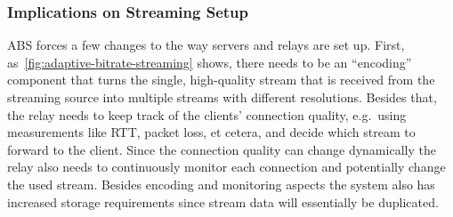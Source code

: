 \subsubsection{Implications on Streaming Setup}
ABS forces a few changes to the way servers and relays are set up.
First, as~\autoref{fig:adaptive-bitrate-streaming} shows, there needs to 
be an ``encoding'' component that turns the single, high-quality stream that is 
received from the streaming source into multiple streams with different resolutions.
Besides that, the relay needs to keep track of the clients' connection quality, e.g.~using 
measurements like RTT, packet loss, et cetera, and decide which stream to forward to the client.
Since the connection quality can change dynamically the relay also needs to continuously
monitor each connection and potentially change the used stream.
Besides encoding and monitoring aspects the system also has increased storage requirements
since stream data will essentially be duplicated.
